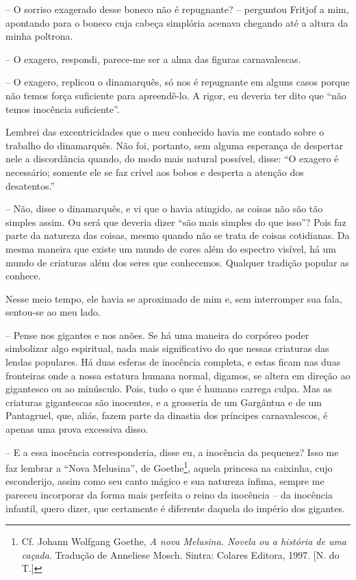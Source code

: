 -- O sorriso exagerado desse boneco não é repugnante? -- perguntou
Fritjof a mim, apontando para o boneco cuja cabeça simplória acenava
chegando até a altura da minha poltrona.

-- O exagero, respondi, parece-me ser a alma das figuras carnavalescas.

-- O exagero, replicou o dinamarquês, só nos é repugnante em alguns
casos porque não temos força suficiente para apreendê-lo. A rigor, eu
deveria ter dito que ``não temos inocência suficiente''.

Lembrei das excentricidades que o meu conhecido havia me contado sobre o
trabalho do dinamarquês. Não foi, portanto, sem alguma esperança de
despertar nele a discordância quando, do modo mais natural possível,
disse: ``O exagero é necessário; somente ele se faz crível aos bobos e
desperta a atenção dos desatentos.''

-- Não, disse o dinamarquês, e vi que o havia atingido, as coisas não
são tão simples assim. Ou será que deveria dizer ``são mais simples do
que isso''? Pois faz parte da natureza das coisas, mesmo quando não se
trata de coisas cotidianas. Da mesma maneira que existe um mundo de
cores além do espectro visível, há um mundo de criaturas além dos seres
que conhecemos. Qualquer tradição popular as conhece.

Nesse meio tempo, ele havia se aproximado de mim e, sem interromper sua
fala, sentou-se ao meu lado.

-- Pense nos gigantes e nos anões. Se há uma maneira do corpóreo poder
simbolizar algo espiritual, nada mais significativo do que nessas
criaturas das lendas populares. Há duas esferas de inocência completa, e
estas ficam nas duas fronteiras onde a nossa estatura humana normal,
digamos, se altera em direção ao gigantesco ou ao minúsculo. Pois, tudo
o que é humano carrega culpa. Mas as criaturas gigantescas são
inocentes, e a grosseria de um Gargântua e de um Pantagruel, que, aliás,
fazem parte da dinastia dos príncipes carnavalescos, é apenas uma prova
excessiva disso.

-- E a essa inocência corresponderia, disse eu, a inocência da pequenez?
Isso me faz lembrar a ``Nova Melusina'', de Goethe\footnote{Cf. Johann
  Wolfgang Goethe, \emph{A nova Melusina. Novela ou a história de uma
  caçada}. Tradução de Anneliese Mosch. Sintra: Colares Editora, 1997.
  {[}N. do T.{]}}, aquela princesa na caixinha, cujo esconderijo, assim
como seu canto mágico e sua natureza ínfima, sempre me pareceu
incorporar da forma mais perfeita o reino da inocência -- da inocência
infantil, quero dizer, que certamente é diferente daquela do império dos
gigantes.

